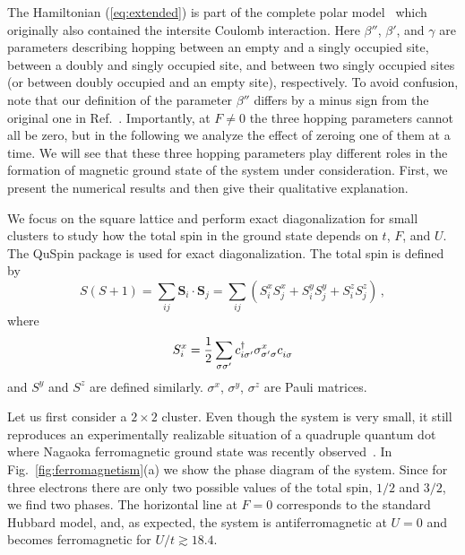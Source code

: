 The Hamiltonian (\ref{eq:extended}) is part of the complete polar model~\cite{vonsovsky1979some1} which originally also contained the intersite Coulomb interaction. Here $\beta''$, $\beta'$, and $\gamma$ are parameters describing hopping between an empty and a singly occupied site, between a doubly and singly occupied site, and between two singly occupied sites (or between doubly occupied and an empty site), respectively. To avoid confusion, note that our definition of the parameter $\beta''$ differs by a minus sign from the original one in Ref.~\cite{vonsovsky1979some1}. Importantly, at $F \neq 0$ the three hopping parameters cannot all be zero, but in the following we analyze the effect of zeroing one of them at a time. We will see that these three hopping parameters play different roles in the formation of magnetic ground state of the system under consideration. First, we present the numerical results and then give their qualitative explanation. 

We focus on the square lattice and perform exact diagonalization for small clusters to study how the total spin in the ground state depends on $t$, $F$, and $U$. The QuSpin package \cite{weinberg2019quspin} is used for exact diagonalization. The total spin is defined by
\begin{equation}\label{eq:spin}
    S(S + 1) = \sum_{ij} \mathbf{S}_i \cdot \mathbf{S}_j = \sum_{ij} (S^x_i S^x_j + S^y_i S^y_j + S^z_i S^z_j)\,,
\end{equation}
where
\begin{equation*}
    S^x_i = \frac{1}{2} \sum_{\sigma\sigma'} c^\dagger_{i\sigma'} \sigma^x_{\sigma'\sigma} c^{\vphantom{\dagger}}_{i\sigma}
\end{equation*}
and $S^y$ and $S^z$ are defined similarly. $\sigma^x$, $\sigma^y$, $\sigma^z$ are Pauli matrices.



Let us first consider a $2\times 2$ cluster. Even though the system is very small, it still reproduces an experimentally realizable situation of a quadruple quantum dot where Nagaoka ferromagnetic ground state was recently observed~\cite{dehollain2020nagaoka}. In Fig.~\ref{fig:ferromagnetism}(a) we show the phase diagram of the system. Since for three electrons there are only two possible values of the total spin, $1/2$ and $3/2$, we find two phases. The horizontal line at $F=0$ corresponds to the standard Hubbard model, and, as expected, the system is antiferromagnetic at $U=0$ and becomes ferromagnetic for $U/t \gtrsim 18.4$.

